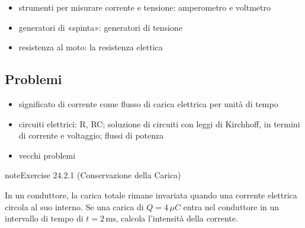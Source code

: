 \documentclass[letterpaper,10pt,italian]{jupyterBook}
\begin{document}
\sphinxAtStartPar
{}
\begin{itemize}
\item {} 
\sphinxAtStartPar
strumenti per misurare corrente e tensione: amperometro e voltmetro

\item {} 
\sphinxAtStartPar
generatori di «spinta»: generatori di tensione

\item {} 
\sphinxAtStartPar
resistenza al moto: la resistenza elettica

\end{itemize}

\sphinxstepscope


\subsection{Problemi}
\label{\detokenize{ch/electromagnetism/electric-current-problems:problemi}}\label{\detokenize{ch/electromagnetism/electric-current-problems:physics-hs-electromagnetism-electric-current-problems}}\label{\detokenize{ch/electromagnetism/electric-current-problems::doc}}\begin{itemize}
\item {} 
\sphinxAtStartPar
significato di corrente come flusso di carica elettrica per unità di tempo

\item {} 
\sphinxAtStartPar
circuiti elettrici: R, RC; soluzione di circuiti con leggi di Kirchhoff, in termini di corrente e voltaggio; flussi di potenza

\item {} 
\sphinxAtStartPar
vecchi problemi

\end{itemize}
 \label{exercise:ch/electromagnetism/electric-current-problems-exercise-0}

\begin{sphinxadmonition}{note}{Exercise 24.2.1 (Conservazione della Carica)}



\sphinxAtStartPar
In un conduttore, la carica totale rimane invariata quando una corrente elettrica circola al suo interno. Se una carica di \(Q = 4 \, \mu C\) entra nel conduttore in un intervallo di tempo di \(t = 2 \, \text{ms}\), calcola l’intensità della corrente.
\end{sphinxadmonition}
 \label{exercise:ch/electromagnetism/electric-current-problems-exercise-1}
\end{document}
